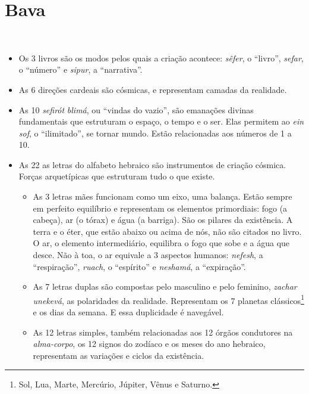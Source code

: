 \chapter*{Bava 
\smallskip{}}

\begin{center}
{\huge{}}\\\medskip{\footnotesize\formularlight{
\lipsum[2]
}}
\end{center}

\begin{itemize}
\item Os 3 livros são os modos pelos quais a criação acontece: \textit{sêfer}, o ``livro'', \textit{sefar}, o ``número'' e \textit{sipur}, a ``narrativa''.

\item As 6 direções cardeais são cósmicas, e representam camadas da realidade. 

\item As 10 \textit{sefirót} \textit{blimá}, ou ``vindas do vazio'', são emanações divinas fundamentais que estruturam o espaço, o tempo e o ser. Elas permitem ao \textit{ein sof}, o ``ilimitado'', se tornar mundo. Estão relacionadas aos números de 1 a 10.

\item As 22 as letras do alfabeto hebraico são instrumentos de criação cósmica. Forças arquetípicas que estruturam tudo o que existe.

\begin{itemize}
\item As 3 letras mães funcionam como um eixo, uma balança. Estão sempre em perfeito equilíbrio e representam os elementos primordiais: fogo (a cabeça), ar (o tórax) e água (a barriga). São os pilares da existência. A terra e o éter, que estão abaixo ou acima de nós, não são citados no livro. O ar, o elemento intermediário, equilibra o fogo que sobe e a água que desce. Não à toa, o ar equivale a 3 aspectos humanos: \textit{nefesh}, a ``respiração'', \textit{ruach}, o ``espírito'' e \textit{neshamá}, a ``expiração''. 
\item As 7 letras duplas são compostas pelo masculino e pelo feminino, \textit{zachar unekevá}, as polaridades da realidade. Representam os 7 planetas clássicos\footnote{Sol, Lua, Marte, Mercúrio, Júpiter, Vênus e Saturno.} e os dias da semana. E essa duplicidade é navegável. 
\item As 12 letras simples, também relacionadas aos 12 órgãos condutores na \textit{alma-corpo}, os 12 signos do zodíaco e os meses do ano hebraico, representam as variações e ciclos da existência. 
\end{itemize}


\end{itemize}
